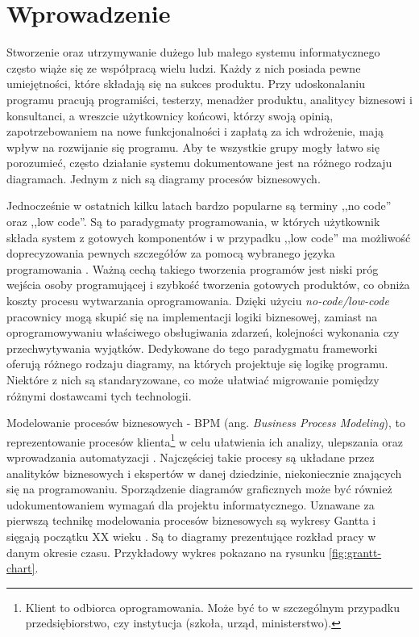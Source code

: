 \documentclass[declaration,shortabstract,mgr]{iithesis}
\author         {Bartłomiej Grochowski}
\date          {}                     %
\begin{document}

\chapter{Wprowadzenie}
Stworzenie oraz utrzymywanie dużego lub małego systemu informatycznego często wiąże się ze współpracą wielu ludzi. Każdy z nich posiada pewne umiejętności, które składają się na sukces produktu. Przy udoskonalaniu programu pracują programiści, testerzy, menadżer produktu, analitycy biznesowi i konsultanci, a wreszcie użytkownicy końcowi, którzy swoją opinią, zapotrzebowaniem na nowe funkcjonalności i zapłatą za ich wdrożenie, mają wpływ na rozwijanie się programu. Aby te wszystkie grupy mogły łatwo się porozumieć, często działanie systemu dokumentowane jest na różnego rodzaju diagramach. Jednym z nich są diagramy procesów biznesowych.

Jednocześnie w ostatnich kilku latach bardzo popularne są terminy ,,no code'' oraz ,,low code''. Są to paradygmaty programowania, w których użytkownik składa system z gotowych komponentów i w przypadku ,,low code'' ma możliwość doprecyzowania pewnych szczegółów za pomocą wybranego języka programowania \cite{lowcode-nocode}. Ważną cechą takiego tworzenia programów jest niski próg wejścia osoby programującej i szybkość tworzenia gotowych produktów, co obniża koszty procesu wytwarzania oprogramowania. Dzięki użyciu \textit{no-code/low-code} pracownicy mogą skupić się na implementacji logiki biznesowej, zamiast na oprogramowywaniu właściwego obsługiwania zdarzeń, kolejności wykonania czy przechwytywania wyjątków. Dedykowane do tego paradygmatu frameworki oferują różnego rodzaju diagramy, na których projektuje się logikę programu. Niektóre z nich są standaryzowane, co może ułatwiać migrowanie pomiędzy różnymi dostawcami tych technologii.

Modelowanie procesów biznesowych - BPM (ang. \textit{Business Process Modeling}), to reprezentowanie procesów klienta\footnote{Klient to odbiorca oprogramowania. Może być to w szczególnym przypadku przedsiębiorstwo, czy instytucja (szkoła, urząd, ministerstwo).} w celu ułatwienia ich analizy, ulepszania oraz wprowadzania automatyzacji \cite{bpm-wiki}. Najczęściej takie procesy są układane przez analityków biznesowych i ekspertów w danej dziedzinie, niekoniecznie znających się na programowaniu. Sporządzenie diagramów graficznych może być również udokumentowaniem wymagań dla projektu informatycznego. Uznawane za pierwszą technikę modelowania procesów biznesowych są wykresy Gantta i sięgają początku XX wieku \cite{bpm-history-wiki}. Są to diagramy prezentujące rozkład pracy w danym okresie czasu. Przykładowy wykres pokazano na rysunku \ref{fig:grantt-chart}.
\end{document}
